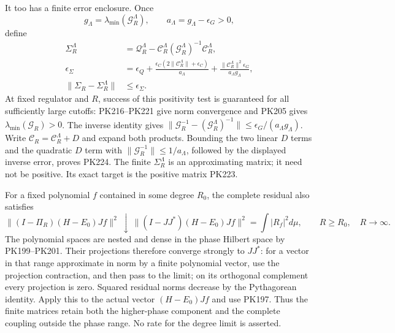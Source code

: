 \documentclass[11pt]{article}
\begin{document}
It too has a finite error enclosure. Once
\[
 g_\Lambda=\lambda_{\min}(\mathcal G^\Lambda_R),\qquad
 a_\Lambda=g_\Lambda-\epsilon_G>0,
\]
define
\[
 \begin{split}
 \Sigma^\Lambda_R
   &=\mathcal Q^\Lambda_R
        -\mathcal C^\Lambda_R
          (\mathcal G^\Lambda_R)^{-1}\mathcal C^\Lambda_R,\\
 \epsilon_\Sigma
   &=\epsilon_Q+
    \frac{\epsilon_C(2\|\mathcal C^\Lambda_R\|+\epsilon_C)}
                      {a_\Lambda}
    +\frac{\|\mathcal C^\Lambda_R\|^2\epsilon_G}
                      {a_\Lambda g_\Lambda},\\
 \|\Sigma_R-\Sigma^\Lambda_R\|&\le\epsilon_\Sigma .
 \end{split}\tag{PK224}
\]
At fixed regulator and \(R\), success of this positivity
test is guaranteed for all sufficiently large cutoffs:
PK216--PK221 give norm convergence and PK205 gives
\(\lambda_{\min}(\mathcal G_R)>0\).
The inverse identity gives
\(\|\mathcal G_R^{-1}-(\mathcal G^\Lambda_R)^{-1}\|
\le\epsilon_G/(a_\Lambda g_\Lambda)\).
Write \(\mathcal C_R=\mathcal C^\Lambda_R+D\) and expand
both products. Bounding the two linear \(D\) terms and the
quadratic \(D\) term with \(\|\mathcal G_R^{-1}\|\le
1/a_\Lambda\), followed by the displayed inverse error,
proves PK224. The finite \(\Sigma^\Lambda_R\) is an
approximating matrix; it need not be positive. Its exact
target is the positive matrix PK223.

For a fixed polynomial \(f\) contained in some degree \(R_0\),
the complete residual also satisfies
\[
 \|(I-\Pi_R)(H-E_0)Jf\|^2
 \ \downarrow\ \|(I-JJ^*)(H-E_0)Jf\|^2
       =\int|R_f|^2d\mu,\qquad R\ge R_0,\quad R\to\infty .
 \tag{PK225}
\]
The polynomial spaces are nested and dense in the phase
Hilbert space by PK199--PK201. Their projections therefore
converge strongly to \(JJ^*\): for a vector in that range
approximate in norm by a finite polynomial vector, use the
projection contraction, and then pass to the limit; on its
orthogonal complement every projection is zero. Squared
residual norms decrease by the Pythagorean identity.
Apply this to the actual vector \((H-E_0)Jf\) and use PK197.
Thus the finite matrices retain both the higher-phase
component and the complete coupling outside the phase range.
No rate for the degree limit is asserted.
\end{document}
